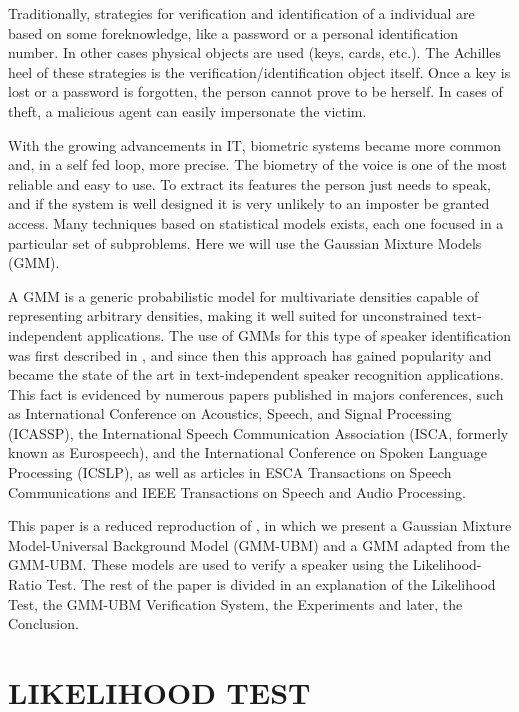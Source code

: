\documentclass[a4paper,twocolumn]{article}
\begin{document}
Traditionally, strategies for verification and identification of a individual are based on some foreknowledge, like a password or a personal identification number. In other cases physical objects are used (keys, cards, etc.). The Achilles heel of these strategies is the verification/identification object itself. Once a key is lost or a password is forgotten, the person cannot prove to be herself. In cases of theft, a malicious agent can easily impersonate the victim.

With the growing advancements in IT, biometric systems became more common and, in a self fed loop, more precise. The biometry of the voice is one of the most reliable and easy to use. To extract its features the person just needs to speak, and if the system is well designed it is very unlikely to an imposter be granted access. Many techniques based on statistical models exists, each one focused in a particular set of subproblems. Here we will use the Gaussian Mixture Models (GMM).

A GMM is a generic probabilistic model for multivariate densities capable of representing arbitrary densities, making it well suited for unconstrained text-independent applications. The use of GMMs for this type of speaker identification was first described in \cite{rose_reynolds_1990}, and since then this approach has gained popularity and became the state of the art in text-independent speaker recognition applications. This fact is evidenced by numerous papers published in majors conferences, such as International Conference on Acoustics, Speech, and Signal Processing (ICASSP), the International Speech Communication Association (ISCA, formerly known as Eurospeech), and the International Conference on Spoken Language Processing (ICSLP), as well as articles in ESCA Transactions on Speech Communications and IEEE Transactions on Speech and Audio Processing.

This paper is a reduced reproduction of \cite{reynolds_et_al_2000}, in which we present a Gaussian Mixture Model-Universal Background Model (GMM-UBM) and a GMM adapted from the GMM-UBM. These models are used to verify a speaker using the Likelihood-Ratio Test. The rest of the paper is divided in an explanation of the Likelihood Test, the GMM-UBM Verification System, the Experiments and later, the Conclusion.


\section{LIKELIHOOD TEST}
\label{likelihood_test}
\end{document}
